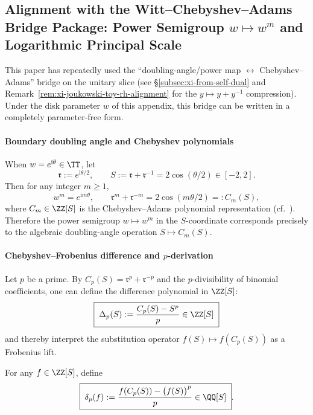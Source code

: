 \subsection{Alignment with the Witt--Chebyshev--Adams Bridge Package: Power Semigroup \texorpdfstring{$w\mapsto w^m$}{w->w(m)} and Logarithmic Principal Scale}\label{subsec:unit-disk-witt-chebyshev}
This paper has repeatedly used the ``doubling-angle/power map \(\leftrightarrow\) Chebyshev--Adams'' bridge on the unitary slice (see \S\ref{subsec:xi-from-self-dual} and Remark~\ref{rem:xi-joukowski-toy-rh-alignment} for the \(y\mapsto y+y^{-1}\) compression).
Under the disk parameter \(w\) of this appendix, this bridge can be written in a completely parameter-free form.

\paragraph{Boundary doubling angle and Chebyshev polynomials}
When \(w=e^{\mathrm{i}\theta}\in\TT\), let
\[
\mathfrak{r}:=e^{\mathrm{i}\theta/2},\qquad S:=\mathfrak{r}+\mathfrak{r}^{-1}=2\cos(\theta/2)\in[-2,2].
\]
Then for any integer \(m\ge 1\),
\[
w^m=e^{\mathrm{i}m\theta},\qquad
\mathfrak{r}^m+\mathfrak{r}^{-m}=2\cos(m\theta/2)=:C_m(S),
\]
where \(C_m\in\ZZ[S]\) is the Chebyshev--Adams polynomial representation (cf.\ \cite{MasonHandscomb2003Chebyshev}).
Therefore the power semigroup \(w\mapsto w^m\) in the \(S\)-coordinate corresponds precisely to the algebraic doubling-angle operation \(S\mapsto C_m(S)\).

\paragraph{Chebyshev--Frobenius difference and \texorpdfstring{$p$}{p}-derivation}
Let \(p\) be a prime. By \(C_p(S)=\mathfrak{r}^p+\mathfrak{r}^{-p}\) and the \(p\)-divisibility of binomial coefficients, one can define the difference polynomial in \(\ZZ[S]\):
\begin{equation}\label{eq:chebyshev-frobenius-delta-poly}
\boxed{\;\Delta_p(S):=\frac{C_p(S)-S^p}{p}\in\ZZ[S]\;}
\end{equation}
and thereby interpret the substitution operator \(f(S)\mapsto f(C_p(S))\) as a Frobenius lift.

\begin{definition}\label{def:chebyshev-frobenius-pderivation}
For any \(f\in\ZZ[S]\), define
\begin{equation}\label{eq:chebyshev-frobenius-pderivation}
\boxed{\;
\delta_p(f):=\frac{f(C_p(S))-\bigl(f(S)\bigr)^p}{p}\in\QQ[S]\; }.
\end{equation}
\end{definition}

